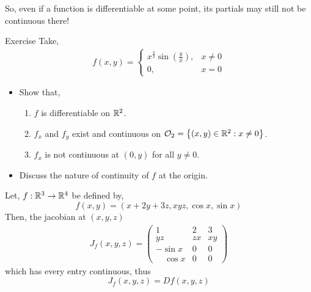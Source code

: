 \documentclass[../Analysis-3.tex]{subfiles}
\begin{document}
So, even if a function is differentiable at some point, its partials may still not be continuous there!

\begin{Eg}{Exercise}{}
  Take, \begin{align*}
    f(x,y) = \begin{cases}
               x^{\frac{4}{3}}\sin{\left( \frac{y}{x} \right)}, & x \not= 0 \\
               0,                                               & x = 0
             \end{cases}
  \end{align*}
  \begin{itemize}
    \item Show that, \begin{enumerate}
            \item $ f $ is differentiable on $ \mathbb{R}^2 $.
            \item $ f_x $ and $ f_y $ exist and continuous on $ \mathcal{O}_{2} = \left\{ (x,y)\in\mathbb{R}^2 : x \not= 0 \right\} $.
            \item $ f_x $ is not continuous at $ (0,y) $ for all $ y \not= 0 $.
          \end{enumerate}
    \item Discuss the nature of continuity of $ f $ at the origin.
  \end{itemize}
\end{Eg}

\begin{Eg}{}{}
  Let, $ f:\mathbb{R}^3 \to \mathbb{R}^4 $ be defined by, \[ f(x,y) = \left( x+2y+3z, xyz, \cos{x}, \sin{x} \right) \]
  Then, the jacobian at $ (x,y,z) $  \begin{align*}
    J_{f}(x,y,z) = \begin{pmatrix}
                     1             & 2  & 3  \\
                     yz            & zx & xy \\
                     -\sin{x}      & 0  & 0  \\
                     \quad \cos{x} & 0  & 0
                   \end{pmatrix}
  \end{align*}
  which has every entry continuous, thus \[J_{f}(x,y,z) = Df(x,y,z)\]
\end{Eg}
\end{document}
